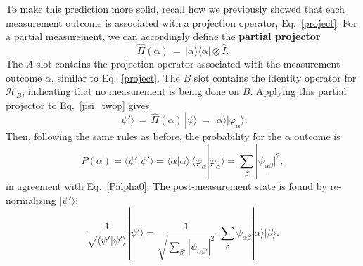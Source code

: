 \documentclass[prx,12pt]{revtex4-2}
\begin{document}
To make this prediction more solid, recall how we previously showed
that each measurement outcome is associated with a projection
operator, Eq.~\eqref{project}.  For a partial measurement, we can
accordingly define the \textbf{partial projector}
\begin{equation}
  \hat{\Pi}(\alpha) \,=\, |\alpha\rangle\langle \alpha| \otimes  \hat{I}.
\end{equation}
The $A$ slot contains the projection operator associated with the
measurement outcome $\alpha$, similar to Eq.~\eqref{project}.  The $B$
slot contains the identity operator for $\mathscr{H}_B$, indicating
that no measurement is being done on $B$.  Applying this partial
projector to Eq.~\eqref{psi_twop} gives
\begin{equation}
  |\psi'\rangle \,=\, \hat{\Pi}(\alpha)\, |\psi\rangle
  \,=\, |\alpha\rangle |\varphi_\alpha\rangle.
\end{equation}
Then, following the same rules as before, the probability for the
$\alpha$ outcome is
\begin{equation}
  P(\alpha) = \langle\psi'|\psi'\rangle
  = \langle \alpha|\alpha\rangle\, \langle \varphi_\alpha|\varphi_\alpha\rangle
  = \sum_\beta |\psi_{\alpha\beta}|^2,
\end{equation}
in agreement with Eq.~\eqref{Palpha0}.  The post-measurement state is
found by re-normalizing $|\psi'\rangle$:
\begin{equation}
  \frac{1}{\sqrt{\langle\psi'|\psi'\rangle}} |\psi'\rangle
  =
  \frac{1}{\sqrt{\sum_{\beta'} |\psi_{\alpha\beta'}|^2}}\;
  \sum_{\beta} \psi_{\alpha\beta} |\alpha\rangle |\beta\rangle.
\end{equation}
\end{document}

